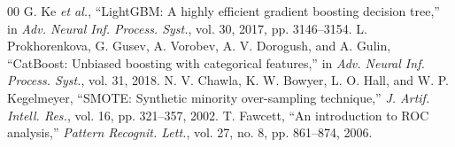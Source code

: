\documentclass[10pt,twocolumn,letterpaper]{article}
\begin{document}
\begin{thebibliography}{00}
 G. Ke \textit{et al.}, ``LightGBM: A highly efficient gradient boosting decision tree,'' in \textit{Adv. Neural Inf. Process. Syst.}, vol. 30, 2017, pp. 3146--3154.
 L. Prokhorenkova, G. Gusev, A. Vorobev, A. V. Dorogush, and A. Gulin, ``CatBoost: Unbiased boosting with categorical features,'' in \textit{Adv. Neural Inf. Process. Syst.}, vol. 31, 2018.
 N. V. Chawla, K. W. Bowyer, L. O. Hall, and W. P. Kegelmeyer, ``SMOTE: Synthetic minority over-sampling technique,'' \textit{J. Artif. Intell. Res.}, vol. 16, pp. 321--357, 2002.
 T. Fawcett, ``An introduction to ROC analysis,'' \textit{Pattern Recognit. Lett.}, vol. 27, no. 8, pp. 861--874, 2006.
\end{thebibliography}
\end{document}
